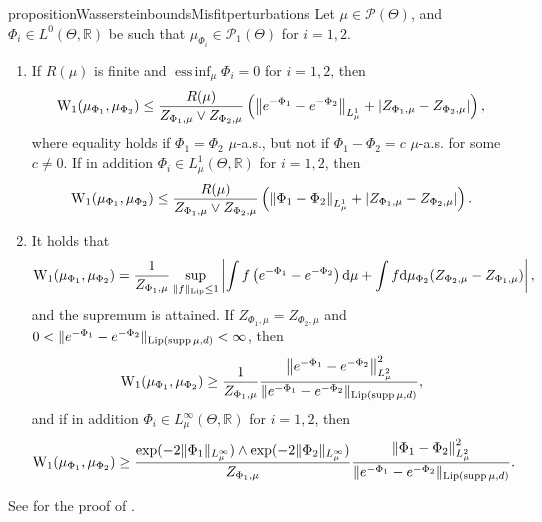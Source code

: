 \documentclass[a4paper]{scrartcl}
\theoremstyle{definition}
\numberwithin{equation}{section}
\newcommand{\R}{\mathbb{R}}
\newcommand{\rd}{\mathrm{d}}
\DeclareMathOperator{\supp}{supp}
\DeclareMathOperator*{\essinf}{ess\,inf}
\newcommand{\Abs}[1]{\left\vert#1\right\vert}
\newcommand{\norm}[1]{\Vert #1 \Vert}
\newcommand{\Norm}[1]{\left\Vert #1 \right\Vert}
\newcommand{\Lip}[0]{\textup{Lip}}
\newcommand{\Was}[0]{\textup{W}}
\begin{document}
\begin{restatable}{proposition}{WassersteinboundsMisfitperturbations}
\label{proposition_W1_bounds_misfit_perturbations}
 Let $\mu\in\mathcal{P}(\Theta)$, and $\Phi_i\in L^0(\Theta,\R)$ be such that $\mu_{\Phi_i}\in \mathcal{P}_1(\Theta)$ for $i=1,2$.
 \begin{enumerate}
\item \label{proposition_W1_bounds_misfit_perturbations_upper_bound}
If $R(\mu)$ is finite and $\essinf_\mu\Phi_i=0$ for $i=1,2$, then
 \begin{equation*}
    \Was_1(\mu_{\Phi_1},\mu_{\Phi_2})\leq \frac{R(\mu)}{Z_{\Phi_1,\mu}\vee Z_{\Phi_2,\mu}}\left(\Norm{ e^{-\Phi_1}-e^{-\Phi_2}}_{L^1_\mu}+\Abs{Z_{\Phi_1,\mu}-Z_{\Phi_2,\mu}}\right),
  \end{equation*}
   where equality holds if $\Phi_1=\Phi_2$ $\mu$-a.s., but not if $\Phi_1-\Phi_2=c$ $\mu$-a.s. for some $c\neq 0$.
   If in addition $\Phi_i\in L^1_\mu(\Theta,\R)$ for $i=1,2$, then
   \begin{equation*}
    \Was_1(\mu_{\Phi_1},\mu_{\Phi_2})\leq \frac{R(\mu)}{Z_{\Phi_1,\mu}\vee Z_{\Phi_2,\mu}}\left(\Norm{\Phi_1-\Phi_2}_{L^1_\mu}+\Abs{Z_{\Phi_1,\mu}-Z_{\Phi_2,\mu}}\right).
   \end{equation*}
  \item \label{proposition_W1_bounds_misfit_perturbations_lower_bound}
  It holds that
  \begin{equation*}
   \Was_1(\mu_{\Phi_1},\mu_{\Phi_2})=\frac{1}{Z_{\Phi_1,\mu}}\sup_{\norm{f}_{\Lip}\leq 1}\Abs{ \int f\left(  e^{-\Phi_1}-e^{-\Phi_2}\right)\rd \mu+\int f \rd \mu_{\Phi_2}(Z_{\Phi_2,\mu}-Z_{\Phi_1,\mu}) },
  \end{equation*}
  and the supremum is attained.
  If $Z_{\Phi_1,\mu}=Z_{\Phi_2,\mu}$ and $0<\norm{e^{-\Phi_1}-e^{-\Phi_2}}_{\Lip(\supp{\mu},d)}<\infty$, then
    \begin{equation*}
   \Was_1(\mu_{\Phi_1},\mu_{\Phi_2})\geq \frac{1}{Z_{\Phi_1,\mu}}\frac{\Norm{e^{-\Phi_1}-e^{-\Phi_2}}_{L^2_\mu}^{2}}{\norm{e^{-\Phi_1}-e^{-\Phi_2}}_{\Lip(\supp{\mu},d)}},
   \end{equation*}
   and if in addition $\Phi_i\in L^\infty_\mu(\Theta,\R)$ for $i=1,2$, then
   \begin{equation*}
   \Was_1(\mu_{\Phi_1},\mu_{\Phi_2})\geq  \frac{\exp(-2\norm{\Phi_1}_{L^\infty_\mu})\wedge \exp(-2\norm{\Phi_2}_{L^\infty_\mu})}{Z_{\Phi_1,\mu}}\frac{\Norm{\Phi_1-\Phi_2}_{L^2_\mu}^{2}}{\norm{e^{-\Phi_1}-e^{-\Phi_2}}_{\Lip(\supp{\mu},d)}}.
  \end{equation*}  
  \end{enumerate}
\end{restatable}
See  for the proof of .
\end{document}
